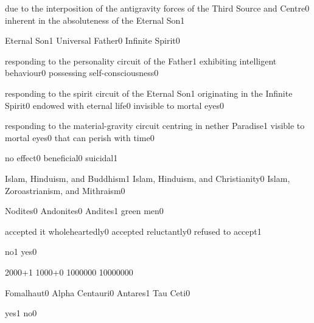 {due to the interposition of the antigravity forces of the Third Source and Centre}{0}
{inherent in the absoluteness of the Eternal Son}{1}
\qstop

{Eternal Son}{1}
{Universal Father}{0}
{Infinite Spirit}{0}
\qstop

{responding to the personality circuit of the Father}{1}
{exhibiting intelligent behaviour}{0}
{possessing self-consciousness}{0}
\qstop

{responding to the spirit circuit of the Eternal Son}{1}
{originating in the Infinite Spirit}{0}
{endowed with eternal life}{0}
{invisible to mortal eyes}{0}
\qstop

{responding to the material-gravity circuit centring in nether Paradise}{1}
{visible to mortal eyes}{0}
{that can perish with time}{0}
\qstop

{no effect}{0}
{beneficial}{0}
{suicidal}{1}
\qstop

{Islam, Hinduism, and Buddhism}{1}
{Islam, Hinduism, and Christianity}{0}
{Islam, Zoroastrianism, and Mithraism}{0}
\qstop

{Nodites}{0}
{Andonites}{0}
{Andites}{1}
{green men}{0}
\qstop

{accepted it wholeheartedly}{0}
{accepted reluctantly}{0}
{refused to accept}{1}
\qstop

{no}{1}
{yes}{0}
\qstop

{2000+}{1}
{1000+}{0}
{100000}{0}
{1000000}{0}
\qstop

{Fomalhaut}{0}
{Alpha Centauri}{0}
{Antares}{1}
{Tau Ceti}{0}
\qstop

{yes}{1}
{no}{0}
\qstop

